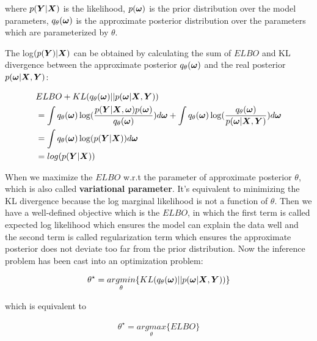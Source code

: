 where $p(\boldsymbol Y| \boldsymbol X)$ is the likelihood, $p(\boldsymbol \omega)$ is the prior distribution over the model parameters, $q_{\theta}(\boldsymbol \omega)$ is the approximate posterior distribution over the parameters which are parameterized by $\theta$.

The log$(p(\boldsymbol Y) | \boldsymbol X)$ can be obtained by calculating the sum of $ELBO$ and KL divergence between the approximate posterior $q_{\theta}(\boldsymbol \omega)$ and the real posterior $p(\boldsymbol \omega | \boldsymbol X, \boldsymbol Y)$:

\begin{equation}\label{2.7}	
\begin{aligned}
& ELBO + KL(q_{\theta}(\boldsymbol{\omega}) || p(\boldsymbol{\omega}|\boldsymbol{X}, \boldsymbol{Y})) \\ 
& = \int q_{\theta}(\boldsymbol{\omega}) \log( \frac{p(\boldsymbol{Y}| \boldsymbol{X}, \boldsymbol{\omega}) p(\boldsymbol{\omega})}{q_{\theta}(\boldsymbol{\omega})}) d\boldsymbol{\omega} + \int q_{\theta}(\boldsymbol{\omega}) \log(\frac{q_{\theta}(\boldsymbol{\omega})}{p(\boldsymbol{\omega}|\boldsymbol{X}, \boldsymbol{Y})}) d\boldsymbol{\omega} \\
& = \int q_{\theta}(\boldsymbol{\omega}) \log(p(\boldsymbol{Y} | \boldsymbol{X}))d\boldsymbol{\omega}\\
& = log(p(\boldsymbol{Y}|\boldsymbol{X})) 
\end{aligned}
\end{equation}

When we maximize the $ELBO$ w.r.t the parameter of approximate posterior $\theta$, which is also called \textbf{variational parameter}. It's equivalent to minimizing the KL divergence because the log marginal likelihood is not a function of $\theta$. Then we have a well-defined objective which is the $ELBO$, in which the first term is called expected log likelihood which ensures the model can explain the data well and the second term is called regularization term which ensures the approximate posterior does not deviate too far from the prior distribution.
Now the inference problem has been cast into an optimization problem:


\begin{equation}\label{2.8}	
\begin{aligned}
\theta^{\star} = \underset{\theta}{argmin} \{KL(q_{\theta}(\boldsymbol \omega)||p(\boldsymbol \omega | \boldsymbol X, \boldsymbol Y))\}
\end{aligned}
\end{equation}

which is equivalent to 

\begin{equation}\label{2.9}	
\begin{aligned}
\theta^{\star} = \underset{\theta}{argmax}\{ELBO\}
\end{aligned}
\end{equation}

